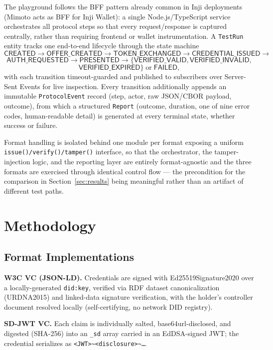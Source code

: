 \documentclass[conference]{IEEEtran}
\begin{document}
The playground follows the BFF pattern already common in Inji deployments (Mimoto acts as BFF for Inji Wallet): a single Node.js/TypeScript service orchestrates all protocol steps so that every request/response is captured centrally, rather than requiring frontend or wallet instrumentation. A \texttt{TestRun} entity tracks one end-to-end lifecycle through the state machine
\[
\textsf{CREATED} \to \textsf{OFFER\_CREATED} \to \textsf{TOKEN\_EXCHANGED} \to \textsf{CREDENTIAL\_ISSUED} \to
\]
\[
\textsf{AUTH\_REQUESTED} \to \textsf{PRESENTED} \to \{\textsf{VERIFIED\_VALID}, \textsf{VERIFIED\_INVALID},
\]
\[
\textsf{VERIFIED\_EXPIRED}\} \;\text{or}\; \textsf{FAILED},
\]
with each transition timeout-guarded and published to subscribers over Server-Sent Events for live inspection. Every transition additionally appends an immutable \texttt{ProtocolEvent} record (step, actor, raw JSON/CBOR payload, outcome), from which a structured \texttt{Report} (outcome, duration, one of nine error codes, human-readable detail) is generated at every terminal state, whether success or failure.

Format handling is isolated behind one module per format exposing a uniform \texttt{issue()/verify()/tamper()} interface, so that the orchestrator, the tamper-injection logic, and the reporting layer are entirely format-agnostic and the three formats are exercised through identical control flow --- the precondition for the comparison in Section~\ref{sec:results} being meaningful rather than an artifact of different test paths.

\section{Methodology}

\subsection{Format Implementations}
\textbf{W3C VC (JSON-LD).} Credentials are signed with Ed25519Signature2020 over a locally-generated \texttt{did:key}, verified via RDF dataset canonicalization (URDNA2015) and linked-data signature verification, with the holder's controller document resolved locally (self-certifying, no network DID registry).

\textbf{SD-JWT VC.} Each claim is individually salted, base64url-disclosed, and digested (SHA-256) into an \texttt{\_sd} array carried in an EdDSA-signed JWT; the credential serializes as \texttt{<JWT>\textasciitilde<disclosure>\textasciitilde\dots}.
\end{document}
